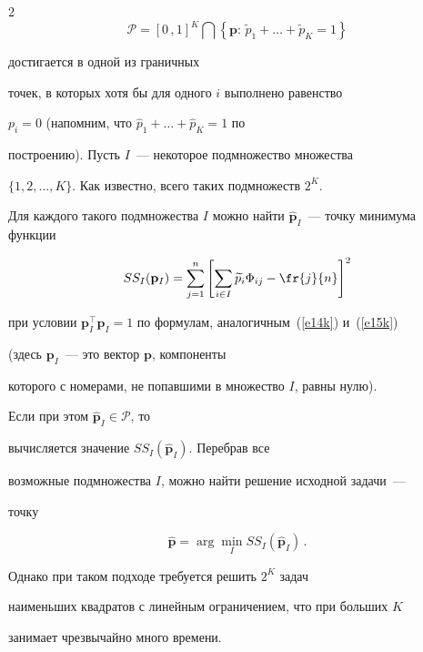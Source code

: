 \begin{multicols}{2}
$$


\mathcal{P}=[0\,,1]^K\bigcap \left \{ {\mathbf p}:\, \widetilde


p_1+\ldots+\widetilde p_K=1\right \}


$$


достигается в одной из граничных


точек, в которых хотя бы для одного $i$ выполнено равенство


$p_i=0$ (напомним, что $\widehat p_1+\ldots+\widehat p_K=1$ по


построению). Пусть $I$~--- некоторое подмножество множества


$\{1,2,\ldots,K\}$. Как известно, всего таких подмножеств $2^K$.


Для каждого такого подмножества $I$ можно найти $\widehat{\mathbf


p}_I$~--- точку минимума функции


$$


SS_I({\mathbf


p_I})=\sum_{j=1}^n\left [\sum_{i\in I}\widetilde


p_i\Phi_{ij}-\fr{j}{n}\right ]^2


$$


при условии ${\mathbf


p}_I^{\top}{\mathbf p}_I=1$ по формулам, аналогичным~(\ref{e14k}) и~(\ref{e15k})


(здесь $\mathbf{p}_I$~--- это вектор $\mathbf{p}$, компоненты


которого с номерами, не попавшими в множество $I$, равны нулю).


Если при этом $\widehat{\mathbf p}_I\in {\mathcal P}$, то


вычисляется значение $SS_I(\widehat{\mathbf p}_I)$. Перебрав все


возможные подмножества $I$, можно найти решение исходной задачи~---


точку


$$


\widehat{\mathbf p}=\arg\min_{I}SS_I\left (\widehat{\mathbf


p}_I\right )\,.


$$


Однако при таком подходе требуется решить $2^K$ задач


наименьших квадратов с линейным ограничением, что при больших $K$


занимает чрезвычайно много времени.






\end{multicols}
